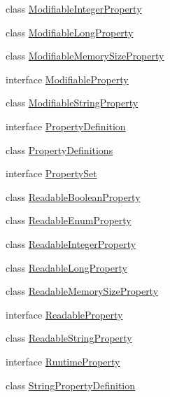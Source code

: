 \begin{DoxyCompactItemize}
\item 
class \mbox{\hyperlink{classcom_1_1mysql_1_1cj_1_1conf_1_1_modifiable_integer_property}{Modifiable\+Integer\+Property}}
\item 
class \mbox{\hyperlink{classcom_1_1mysql_1_1cj_1_1conf_1_1_modifiable_long_property}{Modifiable\+Long\+Property}}
\item 
class \mbox{\hyperlink{classcom_1_1mysql_1_1cj_1_1conf_1_1_modifiable_memory_size_property}{Modifiable\+Memory\+Size\+Property}}
\item 
interface \mbox{\hyperlink{interfacecom_1_1mysql_1_1cj_1_1conf_1_1_modifiable_property}{Modifiable\+Property}}
\item 
class \mbox{\hyperlink{classcom_1_1mysql_1_1cj_1_1conf_1_1_modifiable_string_property}{Modifiable\+String\+Property}}
\item 
interface \mbox{\hyperlink{interfacecom_1_1mysql_1_1cj_1_1conf_1_1_property_definition}{Property\+Definition}}
\item 
class \mbox{\hyperlink{classcom_1_1mysql_1_1cj_1_1conf_1_1_property_definitions}{Property\+Definitions}}
\item 
interface \mbox{\hyperlink{interfacecom_1_1mysql_1_1cj_1_1conf_1_1_property_set}{Property\+Set}}
\item 
class \mbox{\hyperlink{classcom_1_1mysql_1_1cj_1_1conf_1_1_readable_boolean_property}{Readable\+Boolean\+Property}}
\item 
class \mbox{\hyperlink{classcom_1_1mysql_1_1cj_1_1conf_1_1_readable_enum_property}{Readable\+Enum\+Property}}
\item 
class \mbox{\hyperlink{classcom_1_1mysql_1_1cj_1_1conf_1_1_readable_integer_property}{Readable\+Integer\+Property}}
\item 
class \mbox{\hyperlink{classcom_1_1mysql_1_1cj_1_1conf_1_1_readable_long_property}{Readable\+Long\+Property}}
\item 
class \mbox{\hyperlink{classcom_1_1mysql_1_1cj_1_1conf_1_1_readable_memory_size_property}{Readable\+Memory\+Size\+Property}}
\item 
interface \mbox{\hyperlink{interfacecom_1_1mysql_1_1cj_1_1conf_1_1_readable_property}{Readable\+Property}}
\item 
class \mbox{\hyperlink{classcom_1_1mysql_1_1cj_1_1conf_1_1_readable_string_property}{Readable\+String\+Property}}
\item 
interface \mbox{\hyperlink{interfacecom_1_1mysql_1_1cj_1_1conf_1_1_runtime_property}{Runtime\+Property}}
\item 
class \mbox{\hyperlink{classcom_1_1mysql_1_1cj_1_1conf_1_1_string_property_definition}{String\+Property\+Definition}}
\end{DoxyCompactItemize}

